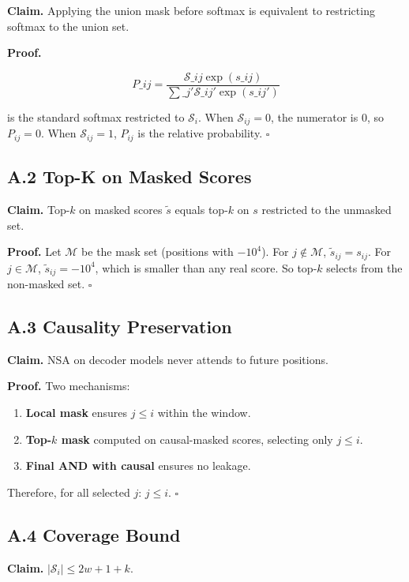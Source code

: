\textbf{Claim.} Applying the union mask before softmax is equivalent to 
restricting softmax to the union set.

\textbf{Proof.} 

\[
P\_{ij} = \frac{\mathcal{S}\_{ij} \exp(s\_{ij})}{\sum\_{j'} \mathcal{S}\_{ij'} \exp(s\_{ij'})}
\tag{A.1}
\]

is the standard softmax restricted to $\mathcal{S}_i$. When $\mathcal{S}_{ij} = 0$, the numerator is 0, so $P_{ij} = 0$. When $\mathcal{S}_{ij} = 1$, $P_{ij}$ is the relative probability. $\square$

\subsection{A.2 Top-K on Masked Scores}

\textbf{Claim.} Top-$k$ on masked scores $\tilde{s}$ equals top-$k$ on $s$ restricted 
to the unmasked set.

\textbf{Proof.} Let $\mathcal{M}$ be the mask set (positions with $-10^4$). For 
$j \notin \mathcal{M}$, $\tilde{s}_{ij} = s_{ij}$. For $j \in \mathcal{M}$, 
$\tilde{s}_{ij} = -10^4$, which is smaller than any real score. So top-$k$ 
selects from the non-masked set. $\square$

\subsection{A.3 Causality Preservation}

\textbf{Claim.} NSA on decoder models never attends to future positions.

\textbf{Proof.} Two mechanisms:

\begin{enumerate}
\item \textbf{Local mask} ensures $j \leq i$ within the window.
\item \textbf{Top-$k$ mask} computed on causal-masked scores, selecting only
  $j \leq i$.
\item \textbf{Final AND with causal} ensures no leakage.

\end{enumerate}
Therefore, for all selected $j$: $j \leq i$. $\square$

\subsection{A.4 Coverage Bound}

\textbf{Claim.} $|\mathcal{S}_i| \leq 2w + 1 + k$.

